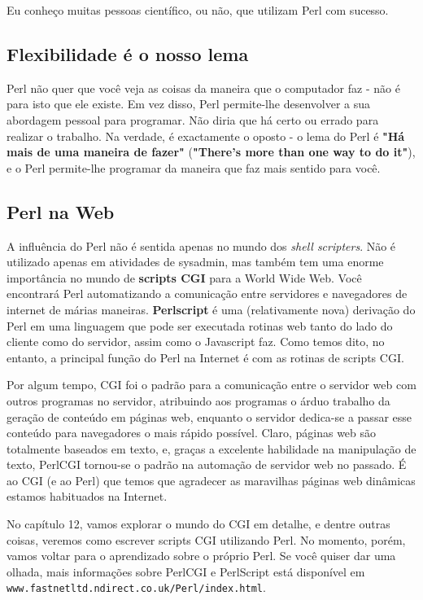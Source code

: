 \documentclass[a4paper,12pt,twoside]{book}
\begin{document}
\noindent Eu conheço muitas pessoas científico, ou não, que utilizam Perl com sucesso.

\subsection{Flexibilidade é o nosso lema}

\noindent Perl não quer que você veja as coisas da maneira que o computador faz - não 
é para isto que ele existe. Em vez disso, Perl permite-lhe desenvolver a sua 
abordagem pessoal para programar. Não diria que há certo ou errado para realizar 
o trabalho. Na verdade, é exactamente o oposto - o lema do Perl é \textbf{"Há mais 
de uma maneira de fazer"} (\textbf{"There's more than one way to do it"}), e o Perl 
permite-lhe programar da maneira que faz mais sentido para você.

\subsection{Perl na Web}

\noindent A influência do Perl não é sentida apenas no mundo dos \textit{shell scripters}. 
Não é utilizado apenas em atividades de sysadmin, mas também tem uma enorme importância no 
mundo de \textbf{scripts CGI} para a World Wide Web. Você encontrará Perl automatizando 
a comunicação entre servidores e navegadores de internet de márias maneiras. 
\textbf{Perlscript} é uma (relativamente nova) derivação do Perl em uma linguagem que pode 
ser executada rotinas web tanto do lado do cliente como do servidor, assim como o Javascript 
faz. Como temos dito, no entanto, a principal função do Perl na Internet 
é com as rotinas de scripts CGI.\medskip

\noindent Por algum tempo, CGI foi o padrão para a comunicação entre o servidor web com outros 
programas no servidor, atribuindo aos programas o árduo trabalho da geração de conteúdo 
em páginas web, enquanto o servidor dedica-se a passar esse conteúdo para navegadores o 
mais rápido possível. Claro, páginas web são totalmente baseados em texto, e, graças a 
excelente habilidade na manipulação de texto, PerlCGI tornou-se o padrão na automação de 
servidor web no passado. É ao CGI (e ao Perl) que temos que agradecer as maravilhas páginas 
web dinâmicas estamos habituados na Internet.\medskip

\noindent No capítulo 12, vamos explorar o mundo do CGI em detalhe, e dentre outras coisas, 
veremos como escrever scripts CGI utilizando Perl. No momento, porém, vamos voltar para o 
aprendizado sobre o próprio Perl. Se você quiser dar uma olhada, mais informações sobre PerlCGI 
e PerlScript está disponível em \texttt{www.fastnetltd.ndirect.co.uk/Perl/index.html}.
\end{document}
